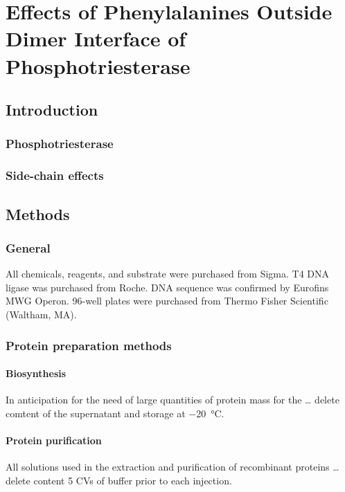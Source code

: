 \chapter{Effects of Phenylalanines Outside Dimer Interface of Phosphotriesterase}
\label{chap:dimer}
\begin{refsection}

\section{Introduction}

\subsection{Phosphotriesterase}

\subsection{Side-chain effects}

\section{Methods}

\subsection{General}

All chemicals, reagents, and substrate were purchased from Sigma. T4 DNA ligase
was purchased from Roche. DNA sequence was confirmed by Eurofins MWG Operon.
96-well plates were purchased from Thermo Fisher Scientific (Waltham, MA)\cite{Yang2014a}.

\subsection{Protein preparation methods}

\subsubsection{Biosynthesis}

In anticipation for the need of large quantities of protein mass for the \ldots
delete comtent of the supernatant and storage at \SI{-20}{\celsius}.

\subsubsection{Protein purification}
All solutions used in the extraction and purification of recombinant proteins
\ldots delete content 5 CVs of buffer prior to each injection.


\end{refsection}
